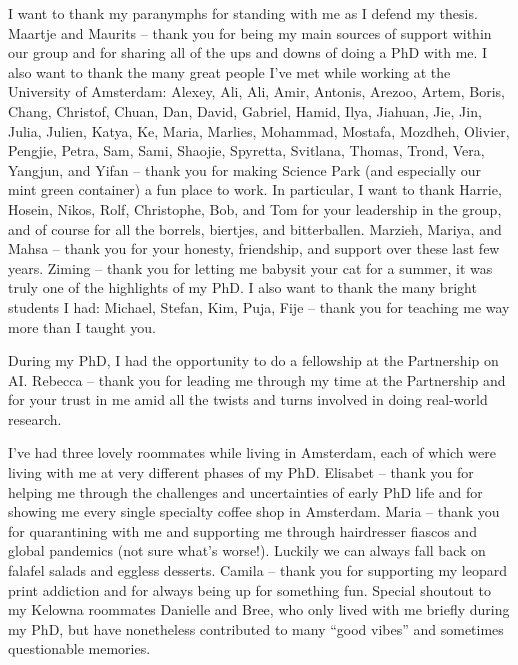 {I want to thank my paranymphs for standing with me as I defend my thesis. 
Maartje and Maurits -- thank you for being my main sources of support within our group and for sharing all of the ups and downs of doing a PhD with me. I also want to thank the many great people I've met while working at the University of Amsterdam:
Alexey, 
Ali, 
Ali, 
Amir, 
Antonis, 
Arezoo, 
Artem, 
Boris, 
Chang, 
Christof, 
Chuan,
Dan,  
David, 
Gabriel, 
Hamid, 
Ilya, 
Jiahuan, 
Jie, 
Jin, 
Julia, 
Julien, 
Katya, 
Ke, 
Maria, 
Marlies, 
Mohammad, 
Mostafa, 
Mozdheh, 
Olivier, 
Pengjie, 
Petra, 
Sam, 
Sami, 
Shaojie,
Spyretta, 
Svitlana, 
Thomas, 
Trond, 
Vera, 
Yangjun, and 
Yifan -- thank you for making Science Park (and especially our mint green container) a fun place to work.  
%
In particular, I want to thank 
Harrie,
Hosein, 
Nikos, 
Rolf, 
Christophe, 
Bob, and 
Tom for your leadership in the group, and of course for all the borrels, biertjes, and bitterballen. 
Marzieh, 
Mariya, and
Mahsa
 -- thank you for your honesty, friendship, and support over these last few years. 
Ziming -- thank you for letting me babysit your cat for a summer, it was truly one of the highlights of my PhD. 
I also want to thank the many bright students I had: Michael, Stefan, Kim, Puja, Fije -- thank you for teaching me way more than I taught you. 




During my PhD, I had the opportunity to do a fellowship at the Partnership on AI. Rebecca -- thank you for leading me through my time at the Partnership and for your trust in me amid all the twists and turns involved in doing real-world research. 
\pagebreak


I've had three lovely roommates while living in Amsterdam, each of which were living with me at very different phases of my PhD. 
Elisabet -- thank you for helping me through the challenges and uncertainties of early PhD life and for showing me every single specialty coffee shop in Amsterdam. 
%
Maria -- thank you for quarantining with me and supporting me through hairdresser fiascos and global pandemics (not sure what's worse!). Luckily we can always fall back on falafel salads and eggless desserts. 
%
Camila -- thank you for supporting my leopard print addiction and for always being up for something fun. 
%
Special shoutout to my Kelowna roommates Danielle and Bree, who only lived with me briefly during my PhD, but have nonetheless contributed to many ``good vibes'' and sometimes questionable memories. \\ 


}
